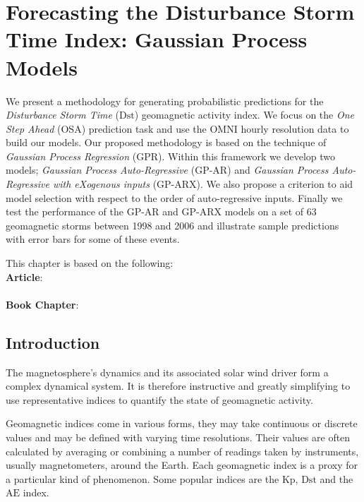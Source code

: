 \chapter{Forecasting the Disturbance Storm Time Index: Gaussian Process Models}\label{chapter:dst_osa}


{\small
        We present a methodology for generating probabilistic predictions for the \emph{Disturbance Storm Time} ($\mathrm{Dst}$) 
        geomagnetic activity index. We focus on the \emph{One Step Ahead} (OSA) prediction task and use the OMNI hourly resolution 
        data to build our models. Our proposed methodology is based on the technique of \emph{Gaussian Process Regression} (GPR). 
        Within this framework we develop two models; \emph{Gaussian Process Auto-Regressive} (GP-AR) and 
        \emph{Gaussian Process Auto-Regressive with eXogenous inputs} (GP-ARX). We also propose a criterion to aid model selection 
        with respect to the order of auto-regressive inputs. Finally we test the performance of the GP-AR and GP-ARX models on a set 
        of 63 geomagnetic storms between 1998 and 2006 and illustrate sample predictions with error bars for some of these events.
}
        
\vspace{5pt}
\vspace{6pt}
\vfill

\noindent
    \parbox{\textwidth}{%
        {\small This chapter is based on the following:\\
        
        \textbf{Article}:\\
        \\
        
        \textbf{Book Chapter}:\\
        }
    }%

\clearpage

\section{Introduction}


The magnetosphere's dynamics and its associated solar wind driver form a complex dynamical system. It is therefore instructive and greatly simplifying to use representative indices to quantify the state of geomagnetic activity.

Geomagnetic indices come in various forms, they may take continuous or discrete values and may be defined with varying time resolutions. Their values are often calculated by averaging or combining a number of readings taken by instruments, usually magnetometers, around the Earth. Each geomagnetic index is a proxy for a particular kind of phenomenon. Some popular indices are the $\mathrm{Kp}$, $\mathrm{Dst}$ and the $\mathrm{AE}$ index.


